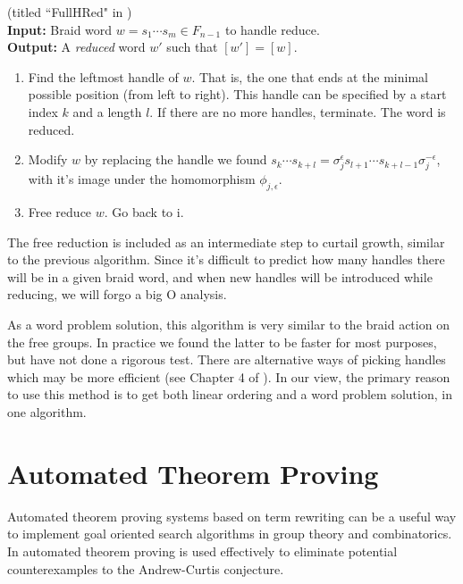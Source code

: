 \documentclass[12pt]{thesis}
\begin{document}
\begin{algorithm} (titled ``FullHRed" in \cite{dehornoy})
    ~\\
    \textbf{Input:} Braid word $w = s_{1} \cdots s_{m} \in F_{n-1}$ to handle reduce.
    ~\\
    \textbf{Output:} A \textit{reduced} word $w'$ such that $[w'] = [w]$.

    \begin{enumerate}
        \item Find the leftmost handle of $w$.
            That is, the one that ends at the minimal possible position (from left to right).
              This handle can be specified by a start index $k$ and a length $l$.
              If there are no more handles, terminate. The word is reduced.

          \item Modify $w$ by replacing the handle we found
            $s_{k} \cdots s_{k + l} = \sigma_{j}^{\epsilon}s_{l+1} \cdots s_{k + l -1}\sigma_{j}^{-\epsilon}$,
              with it's image under the homomorphism $\phi_{j, \epsilon}$.

          \item Free reduce $w$. Go back to i.
    \end{enumerate}
\end{algorithm}

The free reduction is included as an intermediate step 
to curtail growth, similar to the previous algorithm.
Since it's difficult to predict how many handles there will be 
in a given braid word, 
and when new handles will be introduced while reducing, we will forgo a big O
analysis.

As a word problem solution, this algorithm
is very similar to the braid action on the free groups.
In practice we found the latter to be faster for most purposes,
but have not done a rigorous test.
There are alternative 
 ways of picking 
handles which may be more efficient (see Chapter 4 of \cite{dehornoy}).
In our view, the primary reason to use this method is to get both linear ordering
and a word problem solution, in one algorithm.

\iffalse

\section{Automated Theorem Proving}

Automated theorem proving systems based on term rewriting can be a useful way to implement goal
oriented search algorithms in group theory and combinatorics.
In \cite{ac-conjecture} automated theorem proving
is used effectively to eliminate potential counterexamples to the Andrew-Curtis conjecture.
\end{document}
